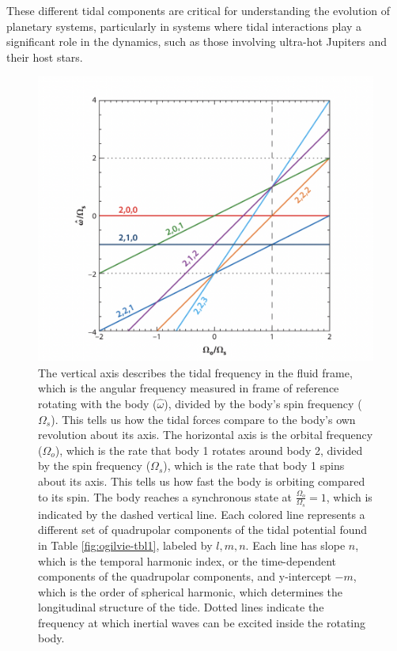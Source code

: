 \documentclass[oneside,12pt]{amsart}
\numberwithin{page}{section}
\begin{document}
These different tidal components are critical for understanding the evolution of planetary systems, particularly in systems where tidal interactions play a significant role in the dynamics, such as those involving ultra-hot Jupiters and their host stars.

\begin{figure}[htbp]
    \centering
    \includegraphics[width=0.8\linewidth]{figs/ogilvie_fig2.png}
    \caption{The vertical axis describes the tidal frequency in the fluid frame, which is the angular frequency measured in frame of reference rotating with the body ($\hat{\omega}$), divided by the body's spin frequency ($\Omega_s$). This tells us how the tidal forces compare to the body's own revolution about its axis. The horizontal axis is the orbital frequency ($\Omega_o$), which is the rate that body 1 rotates around body 2, divided by the spin frequency ($\Omega_s$), which is the rate that body 1 spins about its axis. This tells us how fast the body is orbiting compared to its spin. The body reaches a synchronous state at $\frac{\Omega_o}{\Omega_s} = 1$, which is indicated by the dashed vertical line. 
    Each colored line represents a different set of quadrupolar components of the tidal potential found in Table \ref{fig:ogilvie-tbl1}, labeled by $l, m, n$. Each line has slope $n$, which is the temporal harmonic index, or the time-dependent components of the quadrupolar components, and y-intercept $-m$, which is the order of spherical harmonic, which determines the longitudinal structure of the tide.
    Dotted lines indicate the frequency at which inertial waves can be excited inside the rotating body.}
    \label{fig:ogilvie-fig2}
\end{figure}
\end{document}

